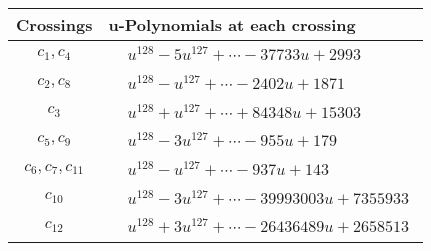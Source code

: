 \documentclass[1p]{elsarticle_modified}
\theoremstyle{definition}
\begin{document}
\begin{tabular}{m{50pt}|m{274pt}}
Crossings & \hspace{64pt}u-Polynomials at each crossing \\
\hline $$\begin{aligned}c_{1},c_{4}\end{aligned}$$&$\begin{aligned}
&u^{128}-5 u^{127}+\cdots-37733 u+2993
\end{aligned}$\\
\hline $$\begin{aligned}c_{2},c_{8}\end{aligned}$$&$\begin{aligned}
&u^{128}- u^{127}+\cdots-2402 u+1871
\end{aligned}$\\
\hline $$\begin{aligned}c_{3}\end{aligned}$$&$\begin{aligned}
&u^{128}+u^{127}+\cdots+84348 u+15303
\end{aligned}$\\
\hline $$\begin{aligned}c_{5},c_{9}\end{aligned}$$&$\begin{aligned}
&u^{128}-3 u^{127}+\cdots-955 u+179
\end{aligned}$\\
\hline $$\begin{aligned}c_{6},c_{7},c_{11}\end{aligned}$$&$\begin{aligned}
&u^{128}- u^{127}+\cdots-937 u+143
\end{aligned}$\\
\hline $$\begin{aligned}c_{10}\end{aligned}$$&$\begin{aligned}
&u^{128}-3 u^{127}+\cdots-39993003 u+7355933
\end{aligned}$\\
\hline $$\begin{aligned}c_{12}\end{aligned}$$&$\begin{aligned}
&u^{128}+3 u^{127}+\cdots-26436489 u+2658513
\end{aligned}$\\
\hline
\end{tabular}\\~\\
\end{document}
